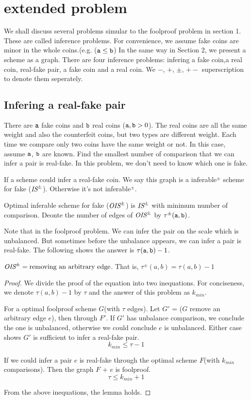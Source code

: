 \section{extended problem}
We shall discuss several problems simular to the foolproof problem in section 1. These are called inference problems. For convenience, we assume fake coins are minor in the whole coins.(e.g. ($\mathtt{a}\leq \mathtt{b} $)
In the same way in Section 2, we present a scheme as a graph. There are four inference problems: infering a fake coin,a real coin, real-fake pair, a fake coin and a real coin. We $-$, $+$, $\pm$, $+-$ superscription to denote them seperately.

\subsection*{Infering a real-fake pair}
{
\setlength{\leftskip}{1cm}
\setlength{\rightskip}{1cm}
There are $\mathtt{a}$ fake coins and $\mathtt{b}$ real coins ($\mathtt{a}, \mathtt{b} > 0$). The real coins are all the same weight and also the counterfeit coins, but two  types are different weight. Each time we compare only two coins have the same weight or not. In this case, assume $\mathtt{a}$, $\mathtt{b}$ are known.
Find the smallest number of comparison that we can infer a pair is real-fake. In this problem, we don't need to know which one is fake.\\

}
\begin{definition}
If a scheme could infer a real-fake coin. We say this graph is a inferable$^\pm$ scheme for fake ($\text{\it IS}^\pm$). Otherwise it's not inferable$^\pm$.

Optimal inferable scheme for fake ($\text{\it OIS}^\pm$) is $\text{\it IS}^\pm$ with minimum number of comparison.
Deonte the number of edges of $\text{\it OIS}^\pm$ by $\tau^\pm(\mathtt{a},\mathtt{b})$.
\end{definition}

Note that in the foolproof problem. We can infer the pair on the scale which is unbalanced. But sometimes before the unbalance appears, we can infer a pair is real-fake. The following shows the answer is $\tau(\mathtt{a},\mathtt{b})-1$.

\begin{lemma}
$\text{\it OIS}^\pm= \text{removing an arbitrary edge}$. That is, $\tau^\pm(a,b)=\tau(a,b)-1$
\end{lemma}

\begin{proof}
We divide the proof of the equation into two inequations. For conciseness, we denote $\tau(a,b)-1$ by $\tau$ and the answer of this problem as $k_{min}$.

For a optimal foolproof scheme $G$(with $\tau$ edges). Let $G'$ = ($G$ remove an arbitrary edge $e$), then through $F'$.
If $G'$ has unbalance comparison, we conclude the one is unbalanced, otherwise we could conclude $e$ is unbalanced.
Either case shows $G'$ is sufficient to infer a real-fake pair.
\[k_{min} \leq \tau-1\]

If we could infer a pair $e$ is real-fake through the optimal scheme $F$(with $k_{min}$ comparisons).
Then the graph $F$ + $e$ is foolproof.
\[\tau\leq k_{min}+1\]

From the above inequations, the lemma holds.

\end{proof}
